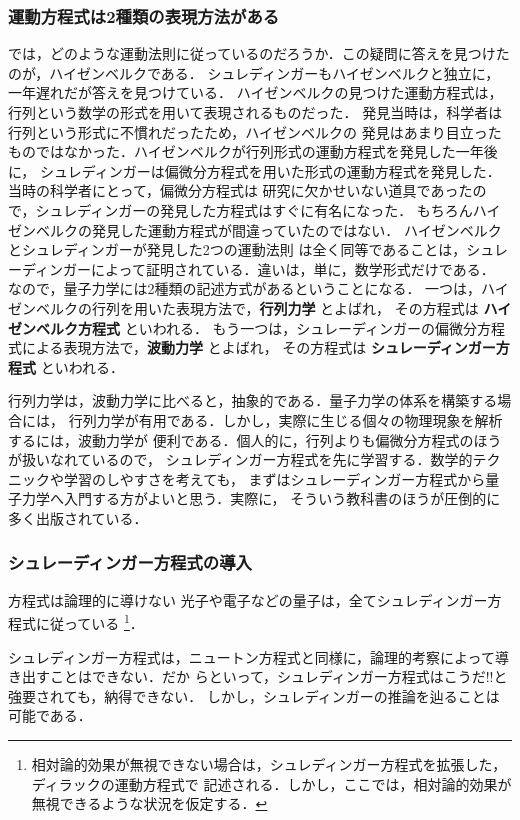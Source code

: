             \subsubsection{運動方程式は2種類の表現方法がある}
            では，どのような運動法則に従っているのだろうか．この疑問に答えを見つけたのが，ハイゼンベルクである．
            シュレディンガーもハイゼンベルクと独立に，一年遅れだが答えを見つけている．
            ハイゼンベルクの見つけた運動方程式は，行列という数学の形式を用いて表現されるものだった．
            発見当時は，科学者は行列という形式に不慣れだったため，ハイゼンベルクの
            発見はあまり目立ったものではなかった．ハイゼンベルクが行列形式の運動方程式を発見した一年後に，
            シュレディンガーは偏微分方程式を用いた形式の運動方程式を発見した．当時の科学者にとって，偏微分方程式は
            研究に欠かせいない道具であったので，シュレディンガーの発見した方程式はすぐに有名になった．
            もちろんハイゼンベルクの発見した運動方程式が間違っていたのではない．
            ハイゼンベルクとシュレディンガーが発見した2つの運動法則
            は全く同等であることは，シュレーディンガーによって証明されている．違いは，単に，数学形式だけである．
            なので，量子力学には2種類の記述方式があるということになる．
            一つは，ハイゼンベルクの行列を用いた表現方法で，\textbf{行列力学} とよばれ，
            その方程式は \textbf{ハイゼンベルク方程式} といわれる．
            もう一つは，シュレーディンガーの偏微分方程式による表現方法で，\textbf{波動力学} とよばれ，
            その方程式は \textbf{シュレーディンガー方程式} といわれる．

            行列力学は，波動力学に比べると，抽象的である．量子力学の体系を構築する場合には，
            行列力学が有用である．しかし，実際に生じる個々の物理現象を解析するには，波動力学が
            便利である．個人的に，行列よりも偏微分方程式のほうが扱いなれているので，
            シュレディンガー方程式を先に学習する．数学的テクニックや学習のしやすさを考えても，
            まずはシュレーディンガー方程式から量子力学へ入門する方がよいと思う．実際に，
            そういう教科書のほうが圧倒的に多く出版されている．

            \subsubsection{シュレーディンガー方程式の導入}
            \begin{mysmallsec}{方程式は論理的に導けない}
            光子や電子などの量子は，全てシュレディンガー方程式に従っている
                \footnote{
                    相対論的効果が無視できない場合は，シュレディンガー方程式を拡張した，ディラックの運動方程式で
                    記述される．しかし，ここでは，相対論的効果が無視できるような状況を仮定する．
                }．

            シュレディンガー方程式は，ニュートン方程式と同様に，論理的考察によって導き出すことはできない．だか
            らといって，シュレディンガー方程式はこうだ!!と強要されても，納得できない．
            しかし，シュレディンガーの推論を辿ることは可能である．
            \end{mysmallsec}

